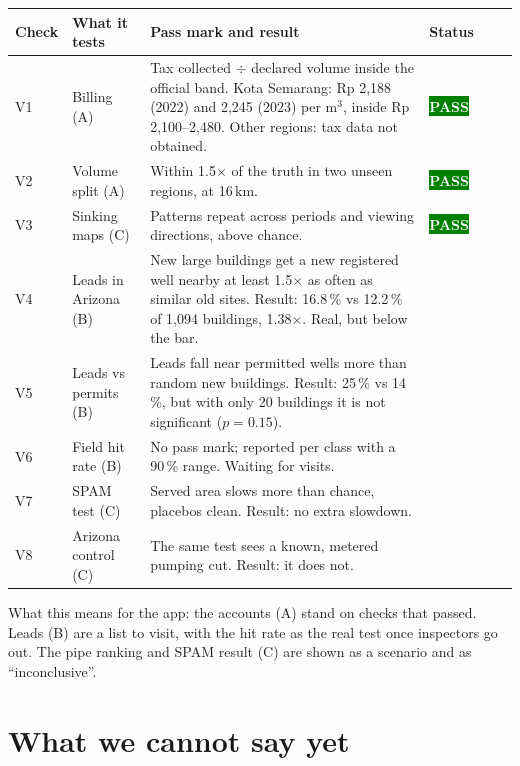 \documentclass[11pt,a4paper]{article}
\newcommand{\pv}[2]{{\setlength{\fboxsep}{1.3pt}\colorbox{#1}{\textcolor{white}{\sffamily\bfseries\fontsize{6.3}{7}\selectfont #2}}}}
\newcommand{\Pass}{\pv{green}{PASS}}
\newcommand{\Fail}{\pv{warm}{FAIL}}
\newcommand{\Wait}{\pv{calc}{WAITING}}
\newcommand{\mthree}{m$^{3}$}
\begin{document}
{\small
\begin{xltabular}{\linewidth}{@{}l L{30mm} Y l@{}}
\toprule
\textbf{Check} & \textbf{What it tests} & \textbf{Pass mark and result} & \textbf{Status}\\
\midrule
\endhead
V1 & Billing (A) & Tax collected $\div$ declared volume inside the official band. Kota Semarang: Rp 2,188
  (2022) and 2,245 (2023) per \mthree, inside Rp 2,100--2,480. Other regions: tax data not obtained. &
  \Pass\\
V2 & Volume split (A) & Within 1.5$\times$ of the truth in two unseen regions, at 16\,km. & \Pass\\
V3 & Sinking maps (C) & Patterns repeat across periods and viewing directions, above chance. & \Pass\\
V4 & Leads in Arizona (B) & New large buildings get a new registered well nearby at least 1.5$\times$ as
  often as similar old sites. Result: 16.8\,\% vs 12.2\,\% of 1,094 buildings, 1.38$\times$. Real, but below
  the bar. & \Fail\\
V5 & Leads vs permits (B) & Leads fall near permitted wells more than random new buildings. Result: 25\,\%
  vs 14\,\%, but with only 20 buildings it is not significant ($p = 0.15$). & \Fail\\
V6 & Field hit rate (B) & No pass mark; reported per class with a 90\,\% range. Waiting for visits. &
  \Wait\\
V7 & SPAM test (C) & Served area slows more than chance, placebos clean. Result: no extra slowdown. &
  \Fail\\
V8 & Arizona control (C) & The same test sees a known, metered pumping cut. Result: it does not. & \Fail\\
\bottomrule
\end{xltabular}}

What this means for the app: the accounts (A) stand on checks that passed. Leads (B) are a list to visit,
with the hit rate as the real test once inspectors go out. The pipe ranking and SPAM result (C) are shown
as a scenario and as ``inconclusive''.

\section{What we cannot say yet}\label{sec:limits}
\end{document}
